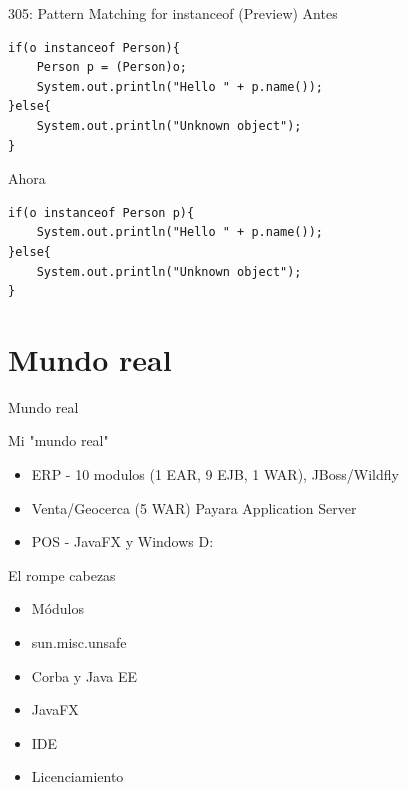 \documentclass[aspectratio=169]{beamer}
\begin{document}
\begin{frame}[fragile]{305:	Pattern Matching for instanceof (Preview)}
Antes
\begin{lstlisting}
if(o instanceof Person){
    Person p = (Person)o;
    System.out.println("Hello " + p.name());
}else{
    System.out.println("Unknown object");
}
\end{lstlisting}	

Ahora
\begin{lstlisting}
if(o instanceof Person p){
    System.out.println("Hello " + p.name());
}else{
    System.out.println("Unknown object");
}
\end{lstlisting}	
\end{frame}

{
    \section{Mundo real}
}

\begin{frame}[fragile]{Mundo real}\scriptsize
    
Mi "mundo real"
    \begin{itemize}
        \item ERP - 10 modulos (1 EAR, 9 EJB, 1 WAR), JBoss/Wildfly
        \item Venta/Geocerca (5 WAR) Payara Application Server
        \item POS - JavaFX y Windows D:
    \end{itemize}
El rompe cabezas
\begin{itemize}
    \item Módulos
    \item sun.misc.unsafe
    \item Corba y Java EE
    \item JavaFX
    \item IDE
    \item Licenciamiento
\end{itemize}
\end{frame}
\end{document}
